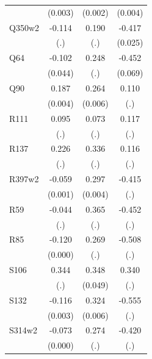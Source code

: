 \begin{table}[htbp]
\begin{tabular}{l*{3}{c}}
                &  (0.003)         &  (0.002)         &  (0.004)         \\
Q350w2          &   -0.114         &    0.190         &   -0.417\sym{***}\\
                &      (.)         &      (.)         &  (0.025)         \\
Q64             &   -0.102\sym{**} &    0.248         &   -0.452\sym{***}\\
                &  (0.044)         &      (.)         &  (0.069)         \\
Q90             &    0.187\sym{***}&    0.264\sym{***}&    0.110         \\
                &  (0.004)         &  (0.006)         &      (.)         \\
R111            &    0.095         &    0.073         &    0.117         \\
                &      (.)         &      (.)         &      (.)         \\
R137            &    0.226         &    0.336         &    0.116         \\
                &      (.)         &      (.)         &      (.)         \\
R397w2          &   -0.059\sym{***}&    0.297\sym{***}&   -0.415         \\
                &  (0.001)         &  (0.004)         &      (.)         \\
R59             &   -0.044         &    0.365         &   -0.452         \\
                &      (.)         &      (.)         &      (.)         \\
R85             &   -0.120\sym{***}&    0.269         &   -0.508         \\
                &  (0.000)         &      (.)         &      (.)         \\
S106            &    0.344         &    0.348\sym{***}&    0.340         \\
                &      (.)         &  (0.049)         &      (.)         \\
S132            &   -0.116\sym{***}&    0.324\sym{***}&   -0.555         \\
                &  (0.003)         &  (0.006)         &      (.)         \\
S314w2          &   -0.073\sym{***}&    0.274         &   -0.420         \\
                &  (0.000)         &      (.)         &      (.)         \\

\end{tabular}
\end{table}

